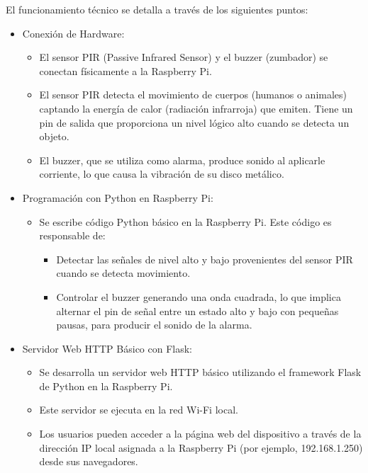 \documentclass{report}
\begin{document}
El funcionamiento técnico se detalla a través de los siguientes puntos:
\begin{itemize}

    \item Conexión de Hardware:
    \begin{itemize}
        \item El sensor PIR (Passive Infrared Sensor) y el  buzzer  (zumbador) se conectan físicamente a la Raspberry Pi.
        \item El sensor PIR detecta el movimiento de cuerpos (humanos o animales) captando la energía de calor (radiación infrarroja) que emiten. 
        Tiene un pin de salida que proporciona un nivel lógico alto cuando se detecta un objeto.
        \item El buzzer, que se utiliza como alarma, produce sonido al aplicarle corriente, lo que causa la vibración de su disco metálico.
    \end{itemize}

    \item Programación con Python en Raspberry Pi:
    \begin{itemize}
        \item Se escribe código Python básico en la Raspberry Pi. Este código es responsable de:
        \begin{itemize}
            \item Detectar las señales de nivel alto y bajo provenientes del sensor PIR cuando se detecta movimiento.
            \item Controlar el buzzer generando una onda cuadrada, lo que implica alternar el pin de señal entre un estado alto y bajo con 
            pequeñas pausas, para producir el sonido de la alarma.
        \end{itemize}
    \end{itemize}

    \item Servidor Web HTTP Básico con Flask:
    \begin{itemize}
        \item Se desarrolla un servidor web HTTP básico utilizando el framework Flask de Python en la Raspberry Pi.
        \item Este servidor se ejecuta en la red Wi-Fi local.
        \item Los usuarios pueden acceder a la página web del dispositivo a través de la dirección IP local asignada a la Raspberry Pi 
        (por ejemplo, 192.168.1.250) desde sus navegadores.
    \end{itemize}


\end{itemize}
\end{document}
